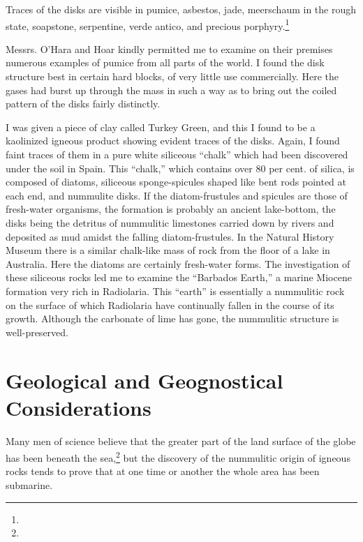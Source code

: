 \documentclass[a4paper, 12pt, oneside]{article}
\begin{document}
Traces of the disks are visible in pumice, asbestos, jade, meerschaum in the rough state, soapstone, serpentine, verde antico, and precious porphyry.\footnote{}

Messrs. O'Hara and Hoar kindly permitted me to examine on their premises numerous examples of pumice from all parts of the world. I found the disk structure best in certain hard blocks, of very little use commercially. Here the gases had burst up through the mass in such a way as to bring out the coiled pattern of the disks fairly distinctly.

I was given a piece of clay called Turkey Green, and this I found to be a kaolinized igneous product showing evident traces of the disks. Again, I found faint traces of them in a pure white siliceous ``chalk'' which had been discovered under the soil in Spain. This ``chalk,'' which contains over 80 per cent. of silica, is composed of diatoms, siliceous sponge-spicules shaped like bent rods pointed at each end, and nummulite disks. If the diatom-frustules and spicules are those of fresh-water organisms, the formation is probably an ancient lake-bottom, the disks being the detritus of nummulitic limestones carried down by rivers and deposited as mud amidst the falling diatom-frustules. In the Natural History Museum there is a similar chalk-like mass of rock from the floor of a lake in Australia. Here the diatoms are certainly fresh-water forms. The investigation of these siliceous rocks led me to examine the ``Barbados Earth,'' a marine Miocene formation very rich in Radiolaria. This ``earth'' is essentially a nummulitic rock on the surface of which Radiolaria have continually fallen in the course of its growth. Although the carbonate of lime has gone, the nummulitic structure is well-preserved.
\clearpage
\section{Geological and Geognostical Considerations}
\paragraph{}
Many men of science believe that the greater part of the land surface of the globe has been beneath the sea,\footnote{} but the discovery of the nummulitic origin of igneous rocks tends to prove that at one time or another the whole area has been submarine.
\end{document}
